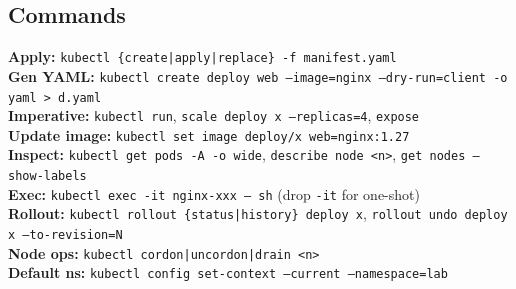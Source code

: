 \subsection{Commands}
\textbf{Apply:} \texttt{kubectl \{create|apply|replace\} -f manifest.yaml} \\
\textbf{Gen YAML:} \texttt{kubectl create deploy web --image=nginx --dry-run=client -o yaml > d.yaml} \\
\textbf{Imperative:} \texttt{kubectl run}, \texttt{scale deploy x --replicas=4}, \texttt{expose} \\
\textbf{Update image:} \texttt{kubectl set image deploy/x web=nginx:1.27} \\
\textbf{Inspect:} \texttt{kubectl get pods -A -o wide}, \texttt{describe node <n>}, \texttt{get nodes --show-labels} \\
\textbf{Exec:} \texttt{kubectl exec -it nginx-xxx -- sh} (drop \texttt{-it} for one-shot) \\
\textbf{Rollout:} \texttt{kubectl rollout \{status|history\} deploy x}, \texttt{rollout undo deploy x --to-revision=N} \\
\textbf{Node ops:} \texttt{kubectl cordon|uncordon|drain <n>} \\
\textbf{Default ns:} \texttt{kubectl config set-context --current --namespace=lab}
